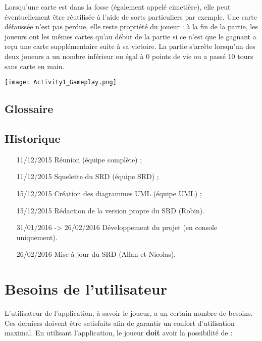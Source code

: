 \documentclass{article}
\begin{document}
			Lorsqu'une carte est dans la fosse (également appelé cimetière), elle peut éventuellement être réutilisée à l'aide de sorts particuliers par exemple. Une carte défaussée n'est pas perdue, elle reste propriété du joueur : à la fin de la partie, les joueurs ont les mêmes cartes qu'au début de la partie si ce n'est que le gagnant a reçu une carte supplémentaire suite à sa victoire. La partie s'arrête lorsqu'un des deux joueurs a un nombre inférieur ou égal à 0 points de vie ou a passé 10 tours sans carte en main.

			\begin{center}\texttt{[image: Activity1\_Gameplay.png]}\end{center}

	\subsection{Glossaire}  %
		\printglossary[type=glossary, style=noIndex, title=]

	\subsection{Historique}
		\begin{itemize}
			\item[11/12/2015] Réunion (équipe complète) ;
			\item[11/12/2015] Squelette du SRD (équipe SRD) ;
			\item[15/12/2015] Création des diagrammes UML (équipe UML) ;
			\item[15/12/2015] Rédaction de la version propre du SRD (Robin).
			\item[31/01/2016] -> 26/02/2016 Développement du projet (en console uniquement).
			\item[26/02/2016]  Mise à jour du SRD (Allan et Nicolas).
		\end{itemize}

\newpage

\section{Besoins de l'utilisateur}
	L'utilisateur de l'application, à savoir le joueur, a un certain nombre de besoins. Ces derniers doivent être satisfaits afin de garantir un confort d'utilisation
	maximal. En utilisant l'application, le joueur \textbf{doit} avoir la possibilité de :
\end{document}
